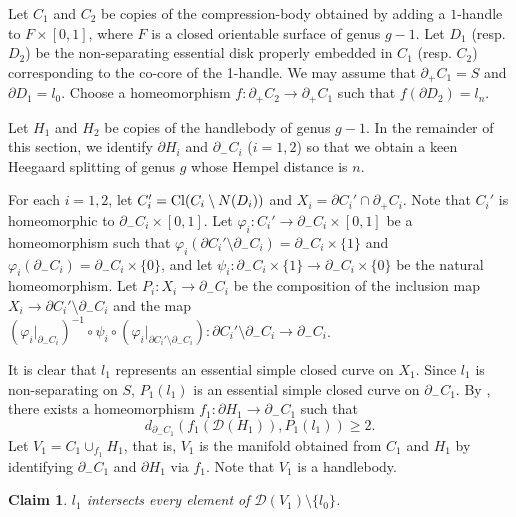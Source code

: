 \documentclass[]{aspm}
\newtheorem{claim}[definition]{Claim}
\begin{document}
Let $C_1$ and $C_2$ be copies of the compression-body obtained by adding a $1$-handle to $F\times [0,1]$, where $F$ is a closed orientable surface of genus $g-1$.
Let $D_1$ (resp. $D_2$) be the non-separating essential disk properly embedded in $C_1$ (resp. $C_2$) corresponding to  the co-core of the 1-handle.
We may assume that $\partial_+C_1=S$ and $\partial D_1=l_0$.
Choose a homeomorphism $f:\partial_+C_2\rightarrow \partial_+C_1$ such that $f(\partial D_2)=l_n$.

Let $H_1$ and $H_2$ be copies of the handlebody of genus $g-1$.
In the remainder of this section, we identify $\partial H_i$ and $\partial_- C_i$ ($i=1,2$) so that we obtain a keen Heegaard splitting of genus $g$ whose Hempel distance is $n$.

For each $i=1,2$, let $C_i'={\rm Cl}(C_i\setminus N(D_i))$ and $X_i=\partial C_i'\cap \partial_+ C_i$. 
Note that $C_i'$ is homeomorphic to $\partial_- C_i\times [0,1]$.
Let $\varphi_i:C_i'\rightarrow \partial_- C_i\times [0,1]$ be a homeomorphism such that $\varphi_i(\partial C_i'\setminus \partial_- C_i)=\partial_- C_i\times\{1\}$ and $\varphi_i(\partial_- C_i)=\partial_- C_i\times\{0\}$, and let $\psi_i:\partial_- C_i\times\{1\}\rightarrow \partial_- C_i\times\{0\}$ be the natural homeomorphism.
Let $P_i:X_i\rightarrow \partial_- C_i$ be the composition of the inclusion map $X_i\rightarrow \partial C_i'\setminus \partial_- C_i$ and the map $\left(\varphi_i|_{\partial_-C_i}\right)^{-1}\circ \psi_i \circ \left(\varphi_i|_{\partial C_i'\setminus \partial_- C_i}\right): \partial C_i'\setminus \partial_- C_i\rightarrow \partial_-C_i$.

It is clear that $l_1$ represents an essential simple closed curve on $X_1$.
Since $l_1$ is non-separating on $S$, $P_1(l_1)$ is an essential simple closed curve on $\partial_- C_1$.
By \cite{AS}, there exists a homeomorphism $f_1:\partial H_1 \rightarrow \partial_- C_1$ such that 
\begin{equation}\label{eqn-f1}
d_{\partial_- C_1} (f_1(\mathcal{D}(H_1)), P_1(l_1))\geq 2.
\end{equation}
Let $V_1=C_1\cup_{f_1} H_1$, that is, $V_1$ is the manifold obtained from $C_1$ and $H_1$ by identifying $\partial_- C_1$ and $\partial H_1$ via $f_1$. Note that $V_{1}$ is a handlebody.

\begin{claim}\label{claim-l1-v1}
$l_1$ intersects every element of $\mathcal{D}(V_1)\setminus \{l_0\}$.
\end{claim}
\end{document}
